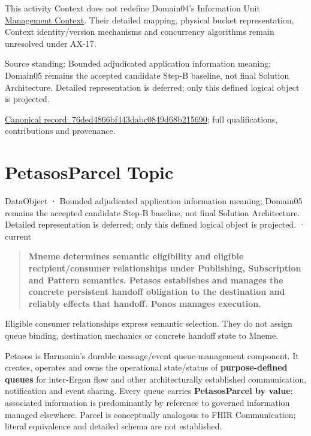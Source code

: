 This activity Context does not redefine Domain04's Information Unit
\href{\detokenize{../../../../../docs/markdown/04-information-architecture/metamodel/information-architecture-metamodel.md#65-context}}{Management Context}.
Their detailed mapping, physical bucket representation, Context identity/version
mechanisms and concurrency algorithms remain unresolved under AX-17.



Source standing: Bounded adjudicated application information meaning; Domain05 remains the accepted candidate Step-B baseline, not final Solution Architecture. Detailed representation is deferred; only this defined logical object is projected.


{\footnotesize \href{../../../../continuum/application/data-object/76ded4866bf443dabc0849d68b215690.md}{Canonical record: 76ded4866bf443dabc0849d68b215690}; full qualifications, contributions and provenance.}\par
\section{PetasosParcel Topic}

\label{element:f0a88f05a0cb438cb42572ec07fb8513}
{\small DataObject · Bounded adjudicated application information meaning; Domain05 remains the accepted candidate Step-B baseline, not final Solution Architecture. Detailed representation is deferred; only this defined logical object is projected. · current}\par

\begin{quote}


\textbf{Mneme determines semantic eligibility and eligible recipient/consumer
relationships under Publishing, Subscription and Pattern semantics. Petasos
establishes and manages the concrete persistent handoff obligation to the
destination and reliably effects that handoff. Ponos manages execution.}



\end{quote}


Eligible consumer relationships express semantic selection. They do not assign
queue binding, destination mechanics or concrete handoff state to Mneme.



Petasos is Harmonia's durable message/event queue-management component.
It creates, operates and owns the operational state/status of \textbf{purpose-defined
queues} for inter-Ergon flow and other architecturally established communication,
notification and event sharing. Every queue carries \textbf{PetasosParcel by value};
associated information is predominantly by reference to governed information
managed elsewhere. Parcel is conceptually analogous to FHIR Communication;
literal equivalence and detailed schema are not established.



